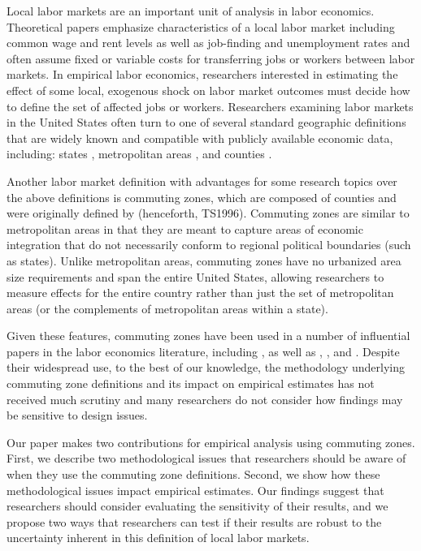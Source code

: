 Local labor markets are an important unit of analysis in labor economics. Theoretical papers emphasize characteristics of a local labor market including common wage and rent levels \citep{Roback1982,Moretti2011} as well as job-finding and unemployment rates \citep{HL2012,SS2014} and often assume fixed or variable costs for transferring jobs or workers between labor markets. In empirical labor economics, researchers interested in estimating the effect of some local, exogenous shock on labor market outcomes must decide how to define the set of affected jobs or workers. Researchers examining labor markets in the United States often turn to one of several standard geographic definitions that are widely known and compatible with publicly available economic data, including: states \citep{BK1992,Wozniak2010,KW2011}, metropolitan areas \citep{BH2000,Card2001,Notowidigdo2011,Diamond2016}, and counties \citep{MRR2015,FGS2015}.

Another labor market definition with advantages for some research topics over the above definitions is commuting zones, which are composed of counties and were originally defined by \citet{TS1996} (henceforth, TS1996). Commuting zones are similar to metropolitan areas in that they are meant to capture areas of economic integration that do not necessarily conform to regional political boundaries (such as states). Unlike metropolitan areas, commuting zones have no urbanized area size requirements and span the entire United States, allowing researchers to measure effects for the entire country rather than just the set of metropolitan areas (or the complements of metropolitan areas within a state). 

Given these features, commuting zones have been used in a number of influential papers in the labor economics literature, including \citet{ADH2013}, as well as \citet{ChettyHendrenKlineSaez2014}, \citet{Yagan2016}, \citet{Restrepo2015} and \citet{AM2015}. Despite their widespread use, to the best of our knowledge, the methodology underlying commuting zone definitions and its impact on empirical estimates has not received much scrutiny and many researchers do not consider how findings may be sensitive to design issues. 

Our paper makes two contributions for empirical analysis using commuting zones. First, we describe two methodological issues that researchers should be aware of when they use the commuting zone definitions. Second, we show how these methodological issues impact empirical estimates. Our findings suggest that researchers should consider evaluating the sensitivity of their results, and we propose two ways that researchers can test if their results are robust to the uncertainty inherent in this definition of local labor markets. 


